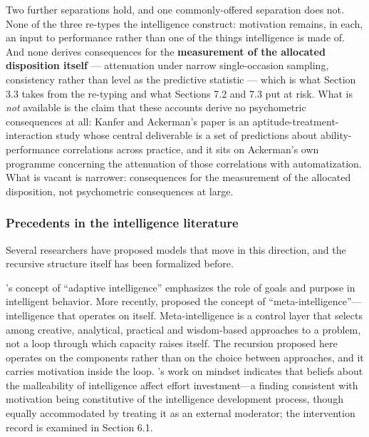 \documentclass[12pt,a4paper]{article}
\begin{document}
Two further separations hold, and one commonly-offered separation does not. None of the three re-types the intelligence construct: motivation remains, in each, an input to performance rather than one of the things intelligence is made of. And none derives consequences for the \textbf{measurement of the allocated disposition itself} ---\hspace{0pt} attenuation under narrow single-occasion sampling, consistency rather than level as the predictive statistic ---\hspace{0pt} which is what Section 3.3 takes from the re-typing and what Sections 7.2 and 7.3 put at risk. What is \emph{not} available is the claim that these accounts derive no psychometric consequences at all: Kanfer and Ackerman's paper is an aptitude-treatment-interaction study whose central deliverable is a set of predictions about ability-performance correlations across practice, and it sits on Ackerman's own programme concerning the attenuation of those correlations with automatization. What is vacant is narrower: consequences for the measurement of the allocated disposition, not psychometric consequences at large.

\subsubsection{Precedents in the intelligence literature}

Several researchers have proposed models that move in this direction, and the recursive structure itself has been formalized before.

\citeauthor{Sternberg2019}'s \citeyearpar{Sternberg2019} concept of ``adaptive intelligence'' emphasizes the role of goals and purpose in intelligent behavior. More recently, \citet{Sternberg2021} proposed the concept of ``meta-intelligence''---\hspace{0pt}intelligence that operates on itself. Meta-intelligence is a control layer that selects among creative, analytical, practical and wisdom-based approaches to a problem, not a loop through which capacity raises itself. The recursion proposed here operates on the components rather than on the choice between approaches, and it carries motivation inside the loop. \citeauthor{Dweck2006}'s \citeyearpar{Dweck2006} work on mindset indicates that beliefs about the malleability of intelligence affect effort investment---\hspace{0pt}a finding consistent with motivation being constitutive of the intelligence development process, though equally accommodated by treating it as an external moderator; the intervention record is examined in Section 6.1.
\end{document}
